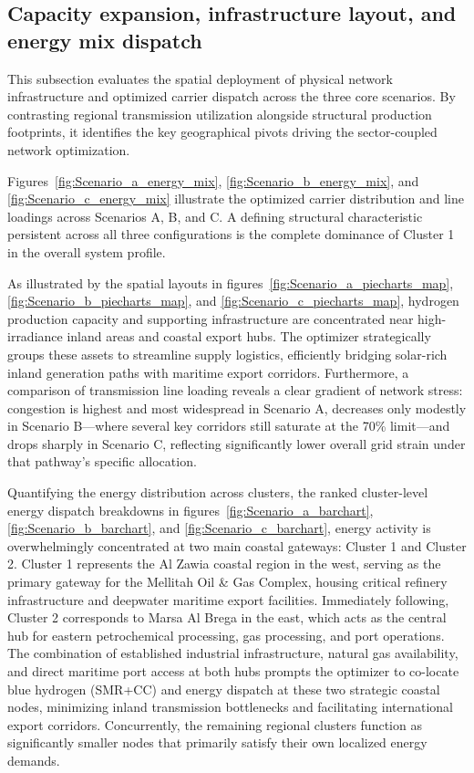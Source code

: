 \documentclass[preprint,12pt]{elsarticle}
\begin{document}
\subsection{Capacity expansion, infrastructure layout, and energy mix dispatch}
This subsection evaluates the spatial deployment of physical network infrastructure and optimized carrier dispatch across the three core scenarios. By contrasting regional transmission utilization alongside structural production footprints, it identifies the key geographical pivots driving the sector-coupled network optimization.

Figures~\ref{fig:Scenario_a_energy_mix}, \ref{fig:Scenario_b_energy_mix}, and \ref{fig:Scenario_c_energy_mix} illustrate the optimized carrier distribution and line loadings across Scenarios A, B, and C. A defining structural characteristic persistent across all three configurations is the complete dominance of Cluster 1 in the overall system profile.


As illustrated by the spatial layouts in figures~\ref{fig:Scenario_a_piecharts_map}, \ref{fig:Scenario_b_piecharts_map}, and \ref{fig:Scenario_c_piecharts_map}, hydrogen production capacity and supporting infrastructure are concentrated near high-irradiance inland areas and coastal export hubs. The optimizer strategically groups these assets to streamline supply logistics, efficiently bridging solar-rich inland generation paths with maritime export corridors. Furthermore, a comparison of transmission line loading reveals a clear gradient of network stress: congestion is highest and most widespread in Scenario A, decreases only modestly in Scenario B—where several key corridors still saturate at the 70\% limit—and drops sharply in Scenario C, reflecting significantly lower overall grid strain under that pathway's specific allocation.


Quantifying the energy distribution across clusters, the ranked cluster-level energy dispatch breakdowns in figures~\ref{fig:Scenario_a_barchart}, \ref{fig:Scenario_b_barchart}, and \ref{fig:Scenario_c_barchart}, energy activity is overwhelmingly concentrated at two main coastal gateways: Cluster 1 and Cluster 2. Cluster 1 represents the Al Zawia coastal region in the west, serving as the primary gateway for the Mellitah Oil \& Gas Complex, housing critical refinery infrastructure and deepwater maritime export facilities. Immediately following, Cluster 2 corresponds to Marsa Al Brega in the east, which acts as the central hub for eastern petrochemical processing, gas processing, and port operations. The combination of established industrial infrastructure, natural gas availability, and direct maritime port access at both hubs prompts the optimizer to co-locate blue hydrogen (SMR+CC) and energy dispatch at these two strategic coastal nodes, minimizing inland transmission bottlenecks and facilitating international export corridors. Concurrently, the remaining regional clusters function as significantly smaller nodes that primarily satisfy their own localized energy demands.
\end{document}
